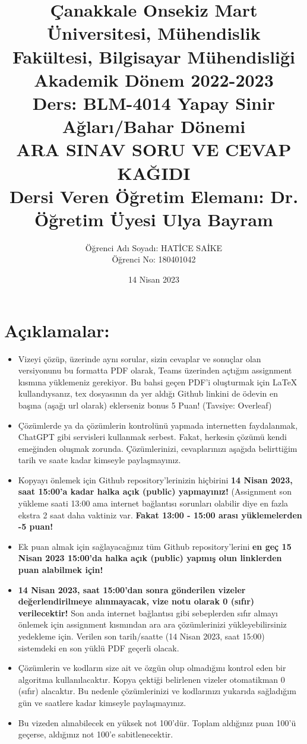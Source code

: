 \documentclass[11pt]{article}
\title{Çanakkale Onsekiz Mart Üniversitesi, Mühendislik Fakültesi, Bilgisayar Mühendisliği Akademik Dönem 2022-2023\\ 
Ders: BLM-4014 Yapay Sinir Ağları/Bahar Dönemi\\ 
ARA SINAV SORU VE CEVAP KAĞIDI\\
Dersi Veren Öğretim Elemanı: Dr. Öğretim Üyesi Ulya Bayram}
\author{%
\begin{minipage}{\textwidth}
\raggedright
Öğrenci Adı Soyadı: HATİCE SAİKE\\ %
Öğrenci No: 180401042
\end{minipage}%
}
\date{14 Nisan 2023}
\begin{document}
\maketitle

\vspace{-.5in}
\section*{Açıklamalar:}
\begin{itemize}
    \item Vizeyi çözüp, üzerinde aynı sorular, sizin cevaplar ve sonuçlar olan versiyonunu bu formatta PDF olarak, Teams üzerinden açtığım assignment kısmına yüklemeniz gerekiyor. Bu bahsi geçen PDF'i oluşturmak için LaTeX kullandıysanız, tex dosyasının da yer aldığı Github linkini de ödevin en başına (aşağı url olarak) eklerseniz bonus 5 Puan! (Tavsiye: Overleaf)
    \item Çözümlerde ya da çözümlerin kontrolünü yapmada internetten faydalanmak, ChatGPT gibi servisleri kullanmak serbest. Fakat, herkesin çözümü kendi emeğinden oluşmak zorunda. Çözümlerinizi, cevaplarınızı aşağıda belirttiğim tarih ve saate kadar kimseyle paylaşmayınız. 
    \item Kopyayı önlemek için Github repository'lerinizin hiçbirini \textbf{14 Nisan 2023, saat 15:00'a kadar halka açık (public) yapmayınız!} (Assignment son yükleme saati 13:00 ama internet bağlantısı sorunları olabilir diye en fazla ekstra 2 saat daha vaktiniz var. \textbf{Fakat 13:00 - 15:00 arası yüklemelerden -5 puan!}
    \item Ek puan almak için sağlayacağınız tüm Github repository'lerini \textbf{en geç 15 Nisan 2023 15:00'da halka açık (public) yapmış olun linklerden puan alabilmek için!}
    \item \textbf{14 Nisan 2023, saat 15:00'dan sonra gönderilen vizeler değerlendirilmeye alınmayacak, vize notu olarak 0 (sıfır) verilecektir!} Son anda internet bağlantısı gibi sebeplerden sıfır almayı önlemek için assignment kısmından ara ara çözümlerinizi yükleyebilirsiniz yedekleme için. Verilen son tarih/saatte (14 Nisan 2023, saat 15:00) sistemdeki en son yüklü PDF geçerli olacak.
    \item Çözümlerin ve kodların size ait ve özgün olup olmadığını kontrol eden bir algoritma kullanılacaktır. Kopya çektiği belirlenen vizeler otomatikman 0 (sıfır) alacaktır. Bu nedenle çözümlerinizi ve kodlarınızı yukarıda sağladığım gün ve saatlere kadar kimseyle paylaşmayınız.
    \item Bu vizeden alınabilecek en yüksek not 100'dür. Toplam aldığınız puan 100'ü geçerse, aldığınız not 100'e sabitlenecektir.

\end{itemize}
\end{document}
